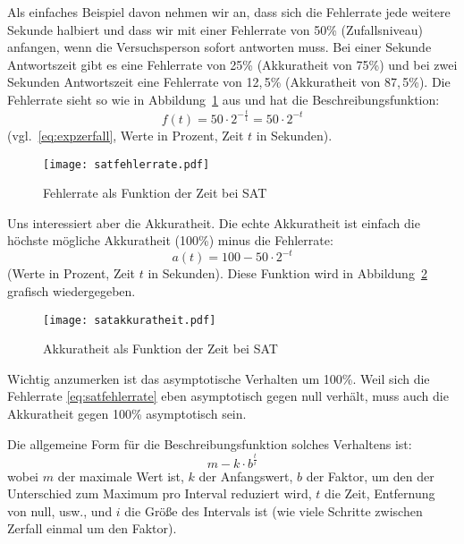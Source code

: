 \documentclass[a4paper,12pt,oneside,leqno]{scrartcl}%
\newcommand{\sep}{,\!}
\begin{document}
Als einfaches Beispiel davon nehmen wir an, dass sich die Fehlerrate jede weitere Sekunde halbiert und dass wir mit einer Fehlerrate von 50\%  (Zufallsniveau) anfangen, wenn die Versuchsperson sofort antworten muss.  Bei einer Sekunde Antwortszeit gibt es eine Fehlerrate von 25\% (Akkuratheit von 75\%) und bei zwei Sekunden Antwortszeit eine Fehlerrate von 12\sep{}\,5\% (Akkuratheit von 87\sep{}\,5\%).  Die Fehlerrate sieht so wie in Abbildung~\ref{fig:satfehlerrate} aus und hat die Beschreibungsfunktion:
\begin{equation}
f(t) = 50\cdot{}2^{-\frac{t}{1}} = 50\cdot{}2^{-t}\label{eq:satfehlerrate}
\end{equation} (vgl.~\eqref{eq:expzerfall}, Werte in Prozent, Zeit $t$ in Sekunden). 
\begin{figure}[htb]
\begin{center}
\texttt{[image: satfehlerrate.pdf]}
\end{center}
\caption{Fehlerrate als Funktion der Zeit bei SAT}\label{fig:satfehlerrate}
\end{figure}
Uns interessiert aber die Akkuratheit.  Die echte Akkuratheit ist einfach die höchste mögliche Akkuratheit (100\%) minus die Fehlerrate: 
\begin{equation}
a(t) = 100 - 50\cdot{}2^{-t}\label{eq:satakkuratheit}
\end{equation} (Werte in Prozent, Zeit $t$ in Sekunden).  Diese Funktion wird in Abbildung~\ref{fig:satakkuratheit} grafisch wiedergegeben.
\begin{figure}[htb]
\begin{center}
\texttt{[image: satakkuratheit.pdf]}
\end{center}
\caption{Akkuratheit als Funktion der Zeit bei SAT }\label{fig:satakkuratheit}
\end{figure}
Wichtig anzumerken ist das asymptotische Verhalten um 100\%. Weil sich die Fehlerrate \eqref{eq:satfehlerrate} eben asymptotisch gegen null verhält, muss auch die Akkuratheit gegen 100\% asymptotisch sein.

Die allgemeine Form für die Beschreibungsfunktion solches Verhaltens ist:
\begin{equation}
m-k\cdot{}b^{\frac{t}{i}}\label{eq:expasymptot}
\end{equation} 
wobei $m$ der maximale Wert ist, $k$ der Anfangswert, $b$ der Faktor, um den der Unterschied zum Maximum pro Interval reduziert wird, $t$ die Zeit, Entfernung von null, usw., und $i$ die Größe des Intervals ist (wie viele Schritte zwischen Zerfall einmal um den Faktor).
\end{document}
